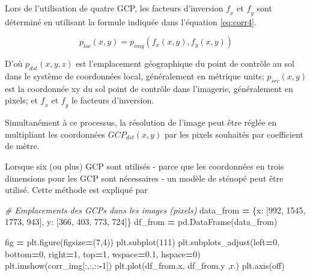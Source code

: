 \documentclass[
]{article}
\newenvironment{Shaded}{\begin{snugshade}}{\end{snugshade}}
\newcommand{\CommentTok}[1]{\textcolor[rgb]{0.56,0.35,0.01}{\textit{#1}}}
\newcommand{\DecValTok}[1]{\textcolor[rgb]{0.00,0.00,0.81}{#1}}
\newcommand{\FloatTok}[1]{\textcolor[rgb]{0.00,0.00,0.81}{#1}}
\newcommand{\NormalTok}[1]{#1}
\newcommand{\OperatorTok}[1]{\textcolor[rgb]{0.81,0.36,0.00}{\textbf{#1}}}
\newcommand{\StringTok}[1]{\textcolor[rgb]{0.31,0.60,0.02}{#1}}
\begin{document}
Lors de l'utilisation de quatre GCP, les facteurs d'inversion \(𝑓_𝑥\) et \(𝑓_𝑦\) sont
déterminé en utilisant la formule indiquée dans l'équation \eqref{eq:corr4}.

\begin{equation}
p_{loc}\left(x,y\right)=p_{img}\left(f_x\left(x,y\right), f_y\left(x,y\right)\right)
\label{eq:corr4}
\end{equation}

D'où \(𝑝_ {𝑑𝑠𝑡} \left (𝑥, 𝑦, 𝑧 \right)\) est l'emplacement géographique du
point de contrôle au sol dans le système de coordonnées local, généralement en métrique
units; \(𝑝_ {𝑠𝑟𝑐} \left (𝑥, 𝑦 \right)\) est la coordonnée xy du sol
point de contrôle dans l'imagerie, généralement en pixels; et \(𝑓_𝑥\) et \(𝑓_𝑦\) le
facteurs d'inversion.

Simultanément à ce processus, la résolution de l'image peut être réglée
en multipliant les coordonnées \(𝐺𝐶𝑃_ {𝑑𝑠𝑡} \left (𝑥, 𝑦 \right)\) par les
pixels souhaités par coefficient de mètre.

Lorsque six (ou plus) GCP sont utilisés - parce que les coordonnées en trois dimensions
pour les GCP sont nécessaires - un modèle de sténopé peut être utilisé. Cette méthode est
expliqué par \citep{jodeau_application_2008}

\begin{Shaded}
\begin{Highlighting}[]
\CommentTok{\# Emplacements des GCPs dans les images (pixels)}
\NormalTok{data\_from }\OperatorTok{=}\NormalTok{ \{}\StringTok{\textquotesingle{}x\textquotesingle{}}\NormalTok{: [}\DecValTok{992}\NormalTok{, }\DecValTok{1545}\NormalTok{, }\DecValTok{1773}\NormalTok{,  }\DecValTok{943}\NormalTok{],}
             \StringTok{\textquotesingle{}y\textquotesingle{}}\NormalTok{: [}\DecValTok{366}\NormalTok{,  }\DecValTok{403}\NormalTok{,  }\DecValTok{773}\NormalTok{,  }\DecValTok{724}\NormalTok{]\}}
\NormalTok{df\_from }\OperatorTok{=}\NormalTok{ pd.DataFrame(data\_from)}


\NormalTok{fig }\OperatorTok{=}\NormalTok{ plt.figure(figsize}\OperatorTok{=}\NormalTok{(}\DecValTok{7}\NormalTok{,}\DecValTok{4}\NormalTok{))}
\NormalTok{plt.subplot(}\DecValTok{111}\NormalTok{)}
\NormalTok{plt.subplots\_adjust(left}\OperatorTok{=}\DecValTok{0}\NormalTok{, bottom}\OperatorTok{=}\DecValTok{0}\NormalTok{, right}\OperatorTok{=}\DecValTok{1}\NormalTok{, top}\OperatorTok{=}\DecValTok{1}\NormalTok{, wspace}\OperatorTok{=}\FloatTok{0.1}\NormalTok{, hspace}\OperatorTok{=}\DecValTok{0}\NormalTok{)}
\NormalTok{plt.imshow(corr\_img[:,:,::}\OperatorTok{{-}}\DecValTok{1}\NormalTok{])}
\NormalTok{plt.plot(df\_from.x, df\_from.y ,}\StringTok{\textquotesingle{}r.\textquotesingle{}}\NormalTok{)}
\NormalTok{plt.axis(}\StringTok{\textquotesingle{}off\textquotesingle{}}\NormalTok{)}
\end{Highlighting}
\end{Shaded}
\end{document}

